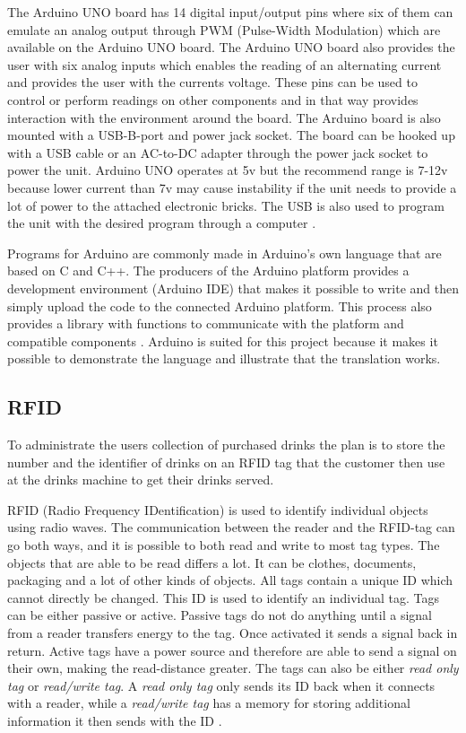 The Arduino UNO board has 14 digital input/output pins where six of them can emulate an analog output through PWM (Pulse-Width Modulation) which are available on the Arduino UNO board. The Arduino UNO board also provides the user with six analog inputs which enables the reading of an alternating current and provides the user with the currents voltage. These pins can be used to control or perform readings on other components and in that way provides interaction with the environment around the board.
The Arduino board is also mounted with a USB-B-port and power jack socket. The board can be hooked up with a USB cable or an AC-to-DC adapter through the power jack socket to power the unit. Arduino UNO operates at 5v but the recommend range is 7-12v because lower current than 7v may cause instability if the unit needs to provide a lot of power to the attached electronic bricks. The USB is also used to program the unit with the desired program through a computer \citep{ArduinoUno}.

Programs for Arduino are commonly made in Arduino's own language that are based on C and C++. The producers of the Arduino platform provides a development environment (Arduino IDE) that makes it possible to write and then simply upload the code to the connected Arduino platform. This process also provides a library with functions to communicate with the platform and compatible components \citep{ArduinoLanguage}.
Arduino is suited for this project because it makes it possible to demonstrate the language and illustrate that the translation works.

\subsection{RFID}
\label{sec:RFID}
To administrate the users collection of purchased drinks the plan is to store the number and the identifier of drinks on an RFID tag that the customer then use at the drinks machine to get their drinks served.

RFID (Radio Frequency IDentification) is used to identify individual objects using radio waves.
The communication between the reader and the RFID-tag can go both ways, and it is possible to both read and write to most tag types. 
The objects that are able to be read differs a lot. It can be clothes, documents, packaging and a lot of other kinds of objects. 
All tags contain a unique ID which cannot directly be changed. This ID is used to identify an individual tag.
Tags can be either passive or active. Passive tags do not do anything until a signal from a reader transfers energy to the tag. Once activated it sends a signal back in return. Active tags have a power source and therefore are able to send a signal on their own, making the read-distance greater.
The tags can also be either \textit{read only tag} or \textit{read/write tag}. A \textit{read only tag} only sends its ID back when it connects with a reader, while a \textit{read/write tag} has a memory for storing additional information it then sends with the ID \citep{RFID}.

